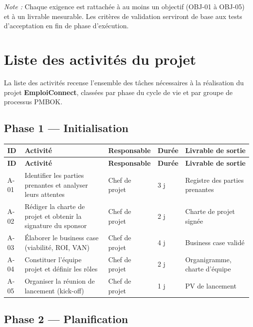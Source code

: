 \documentclass[11pt,a4paper]{article}
\begin{document}
\vspace{0.3em}
\noindent\textit{Note :} Chaque exigence est rattachée à au moins un objectif (OBJ-01 à OBJ-05) et à un livrable mesurable. Les critères de validation serviront de base aux tests d'acceptation en fin de phase d'exécution.

\section{Liste des activités du projet}

La liste des activités recense l'ensemble des tâches nécessaires à la réalisation du projet \textbf{EmploiConnect}, classées par phase du cycle de vie et par groupe de processus PMBOK.

\subsection{Phase 1 --- Initialisation}

\begin{longtable}{|p{1.2cm}|p{5.5cm}|p{2.2cm}|p{2cm}|p{2.5cm}|}
    \hline
    \rowcolor{ifrigray}
    \textbf{ID} & \textbf{Activité} & \textbf{Responsable} & \textbf{Durée} & \textbf{Livrable de sortie} \\
    \hline
    \endfirsthead
    \hline
    \rowcolor{ifrigray}
    \textbf{ID} & \textbf{Activité} & \textbf{Responsable} & \textbf{Durée} & \textbf{Livrable de sortie} \\
    \hline
    \endhead

    A-01 & Identifier les parties prenantes et analyser leurs attentes & Chef de projet & 3 j & Registre des parties prenantes \\
    \hline
    A-02 & Rédiger la charte de projet et obtenir la signature du sponsor & Chef de projet & 2 j & Charte de projet signée \\
    \hline
    A-03 & Élaborer le business case (viabilité, ROI, VAN) & Chef de projet & 4 j & Business case validé \\
    \hline
    A-04 & Constituer l'équipe projet et définir les rôles & Chef de projet & 2 j & Organigramme, charte d'équipe \\
    \hline
    A-05 & Organiser la réunion de lancement (kick-off) & Chef de projet & 1 j & PV de lancement \\
    \hline
\end{longtable}

\subsection{Phase 2 --- Planification}
\end{document}
